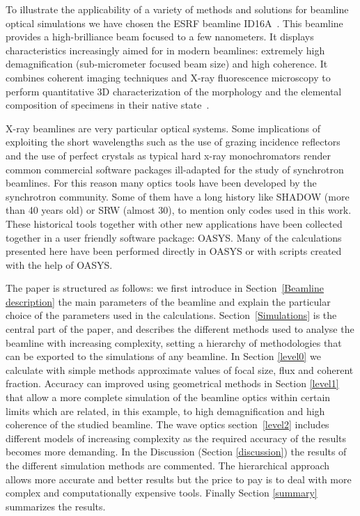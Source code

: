 \documentclass{iucr}              %
\newcommand{\ingreen}[1]{{\color{green}#1}}
\begin{document}
To illustrate the applicability of a variety of methods and solutions for beamline optical simulations we have chosen the ESRF beamline ID16A~\cite{ID16A}. This beamline provides a high-brilliance beam focused to a few nanometers. It displays characteristics increasingly aimed for in modern beamlines: extremely high demagnification (sub-micrometer focused beam size) and high coherence. It combines coherent imaging techniques and X-ray fluorescence microscopy to perform quantitative 3D characterization of the morphology and the elemental composition of specimens in their native state~\ingreen{\cite{XRFID16A}}.

X-ray beamlines are very particular optical systems. Some implications of exploiting the short wavelengths such as the use of grazing incidence reflectors and the use of perfect crystals as typical hard x-ray monochromators render common commercial software packages ill-adapted for the study of synchrotron beamlines. For this reason many optics tools have been developed by the synchrotron community. Some of them have a long history like SHADOW (more than 40 years old) or SRW (almost 30), to mention only codes used in this work. These historical tools together with other new applications have been collected together in a user friendly software package: OASYS. Many of the calculations presented here have been performed directly in OASYS or with scripts created with the help of OASYS. 


The paper is structured as follows: we first introduce in Section~\ref{Beamline description} the main parameters of the beamline and explain the particular choice of the parameters used in the calculations. Section~\ref{Simulations} is the central part of the paper, and describes the different methods used to analyse the beamline with increasing complexity, setting a hierarchy of methodologies that can be exported to the simulations of any beamline. In Section \ref{level0} we calculate with simple methods approximate values of focal size, flux and coherent fraction. Accuracy can improved using geometrical methods in Section \ref{level1} that allow a more complete simulation of the beamline optics within certain limits which are related, in this example, to high demagnification and high coherence of the studied beamline. The wave optics section~\ref{level2} includes different models of increasing complexity as the required accuracy of the results becomes more demanding. In the Discussion (Section \ref{discussion}) the results of the different simulation methods are commented. The hierarchical approach allows more accurate and better results but the price to pay is to deal with more complex and computationally expensive tools. Finally Section \ref{summary} summarizes the results.
\end{document}
